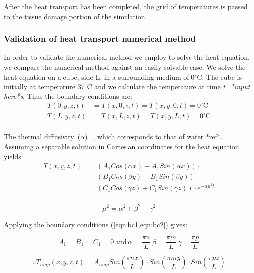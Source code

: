 After the heat transport has been completed, the grid of temperatures is passed to the tissue damage portion of the simulation.
\newpage
\subsubsection{Validation of heat transport numerical method}

In order to validate the numerical method we employ to solve the heat equation, we compare the numerical method against an easily solvable case. We solve the heat equation on a cube, side L, in a surrounding medium of 0$^{\circ}$C. The cube is initially at temperature 37$^{\circ}$C and we calculate the temperature at time \textit{t=*input here*s}. Thus the boundary conditions are:\\

\begin{align}
T(0,y,z,t)&=T(x,0,z,t)=T(x,y,0,t)=0^{\circ}\text{C} \label{eqn:bc1}\\
T(L,y,z,t)&=T(x,L,z,t)=T(x,y,L,t)=0^{\circ}\text{C} \label{eqn:bc2}\\
\end{align}

The thermal diffusivity~($\alpha$)=, which corresponds to that of water *ref*.\\


Assuming a separable solution in Cartesian coordinates for the heat equation yields:
\begin{equation}
\begin{split}
T(x,y,z,t)=&(A_1Cos(\alpha x) + A_1Sin(\alpha x))\cdot\\
&(B_1Cos(\beta y) + B_1Sin(\beta y))\cdot\\
&(C_1Cos(\gamma z) + C_1Sin(\gamma z))\cdot e^{-\alpha\mu^2t}\\
\end{split} 
\end{equation}

\begin{equation}
\mu^2=\alpha^2+\beta^2+\gamma^2
\end{equation}

Applying the boundary conditions (\cref{eqn:bc1,eqn:bc2}) gives:

\begin{equation}
A_1=B_1=C_1=0\
\text{and}\ \alpha=\frac{\pi n}{L}\ \beta=\frac{\pi m}{L}\ \gamma=\frac{\pi p}{L}
\end{equation}

\begin{equation}
\therefore  T_{nmp}(x,y,z,t)=A_{nmp}Sin\left(\frac{\pi n x}{L}\right)\cdot Sin\left(\frac{\pi m y}{L}\right)\cdot Sin\left(\frac{\pi p z}{L}\right)
\end{equation}

